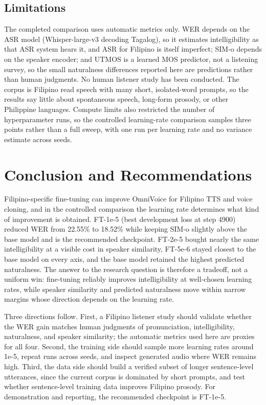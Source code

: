 \documentclass[sigconf,nonacm]{acmart}
\begin{document}
\subsection{Limitations}

The completed comparison uses automatic metrics only. WER depends on the ASR model (Whisper-large-v3 decoding Tagalog), so it estimates intelligibility as that ASR system hears it, and ASR for Filipino is itself imperfect; SIM-o depends on the speaker encoder; and UTMOS is a learned MOS predictor, not a listening survey, so the small naturalness differences reported here are predictions rather than human judgments. No human listener study has been conducted. The corpus is Filipino read speech with many short, isolated-word prompts, so the results say little about spontaneous speech, long-form prosody, or other Philippine languages. Compute limits also restricted the number of hyperparameter runs, so the controlled learning-rate comparison samples three points rather than a full sweep, with one run per learning rate and no variance estimate across seeds.

\section{Conclusion and Recommendations}

Filipino-specific fine-tuning can improve OmniVoice for Filipino TTS and voice cloning, and in the controlled comparison the learning rate determines what kind of improvement is obtained. FT-1e-5 (best development loss at step 4900) reduced WER from 22.55\% to 18.52\% while keeping SIM-o slightly above the base model and is the recommended checkpoint. FT-2e-5 bought nearly the same intelligibility at a visible cost in speaker similarity, FT-5e-6 stayed closest to the base model on every axis, and the base model retained the highest predicted naturalness. The answer to the research question is therefore a tradeoff, not a uniform win: fine-tuning reliably improves intelligibility at well-chosen learning rates, while speaker similarity and predicted naturalness move within narrow margins whose direction depends on the learning rate.

Three directions follow. First, a Filipino listener study should validate whether the WER gain matches human judgments of pronunciation, intelligibility, naturalness, and speaker similarity; the automatic metrics used here are proxies for all four. Second, the training side should sample more learning rates around 1e-5, repeat runs across seeds, and inspect generated audio where WER remains high. Third, the data side should build a verified subset of longer sentence-level utterances, since the current corpus is dominated by short prompts, and test whether sentence-level training data improves Filipino prosody. For demonstration and reporting, the recommended checkpoint is FT-1e-5.
\end{document}
